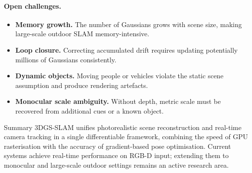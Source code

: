 \paragraph{Open challenges.}
\begin{itemize}
  \item \textbf{Memory growth.}  The number of Gaussians grows with scene size,
        making large-scale outdoor SLAM memory-intensive.
  \item \textbf{Loop closure.}  Correcting accumulated drift requires updating
        potentially millions of Gaussians consistently.
  \item \textbf{Dynamic objects.}  Moving people or vehicles violate the static
        scene assumption and produce rendering artefacts.
  \item \textbf{Monocular scale ambiguity.}  Without depth, metric scale must
        be recovered from additional cues or a known object.
\end{itemize}

\begin{keybox}{Summary}
  3DGS-SLAM unifies photorealistic scene reconstruction and real-time
  camera tracking in a single differentiable framework, combining the
  speed of GPU rasterisation with the accuracy of gradient-based pose
  optimisation.  Current systems achieve real-time performance on RGB-D
  input; extending them to monocular and large-scale outdoor settings
  remains an active research area.
\end{keybox}
